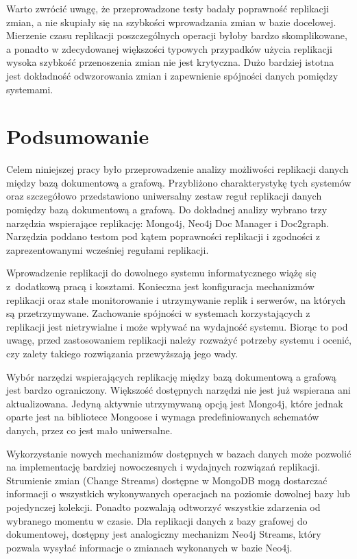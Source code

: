 \documentclass[a4paper,twoside,12pt]{book}
\begin{document}
Warto zwrócić uwagę, że przeprowadzone testy badały poprawność replikacji zmian, a nie skupiały się na szybkości wprowadzania zmian w bazie docelowej. Mierzenie czasu replikacji poszczególnych operacji byłoby bardzo skomplikowane, a ponadto w zdecydowanej większości typowych przypadków użycia replikacji wysoka szybkość przenoszenia zmian nie jest krytyczna. Dużo bardziej istotna jest dokładność odwzorowania zmian i zapewnienie spójności danych pomiędzy systemami.

\chapter{Podsumowanie}

Celem niniejszej pracy było przeprowadzenie analizy możliwości replikacji danych między bazą dokumentową a grafową. Przybliżono charakterystykę tych systemów oraz szczegółowo przedstawiono uniwersalny zestaw reguł replikacji danych pomiędzy bazą dokumentową a grafową. Do dokładnej analizy wybrano trzy narzędzia wspierające replikację: Mongo4j, Neo4j Doc Manager i Doc2graph. Narzędzia poddano testom pod kątem poprawności replikacji i zgodności z zaprezentowanymi wcześniej regułami replikacji. 

Wprowadzenie replikacji do dowolnego systemu informatycznego wiążę się z~dodatkową pracą i kosztami. Konieczna jest konfiguracja mechanizmów replikacji oraz stałe monitorowanie i utrzymywanie replik i serwerów, na których są przetrzymywane. Zachowanie spójności w systemach korzystających z replikacji jest nietrywialne i może wpływać na wydajność systemu. Biorąc to pod uwagę, przed zastosowaniem replikacji należy rozważyć potrzeby systemu i ocenić, czy zalety takiego rozwiązania przewyższają jego wady.

Wybór narzędzi wspierających replikację między bazą dokumentową a grafową jest bardzo ograniczony. Większość dostępnych narzędzi nie jest już wspierana ani aktualizowana. Jedyną aktywnie utrzymywaną opcją jest Mongo4j, które jednak oparte jest na bibliotece Mongoose i wymaga predefiniowanych schematów danych, przez co jest mało uniwersalne.

Wykorzystanie nowych mechanizmów dostępnych w bazach danych może pozwolić na implementację bardziej nowoczesnych i wydajnych rozwiązań replikacji. Strumienie zmian (Change Streams) dostępne w MongoDB mogą dostarczać informacji o wszystkich wykonywanych operacjach na poziomie dowolnej bazy lub pojedynczej kolekcji. Ponadto pozwalają odtworzyć wszystkie zdarzenia od wybranego momentu w czasie. Dla replikacji danych z bazy grafowej do dokumentowej, dostępny jest analogiczny mechanizm Neo4j Streams, który pozwala wysyłać informacje o zmianach wykonanych w bazie Neo4j.
\end{document}
